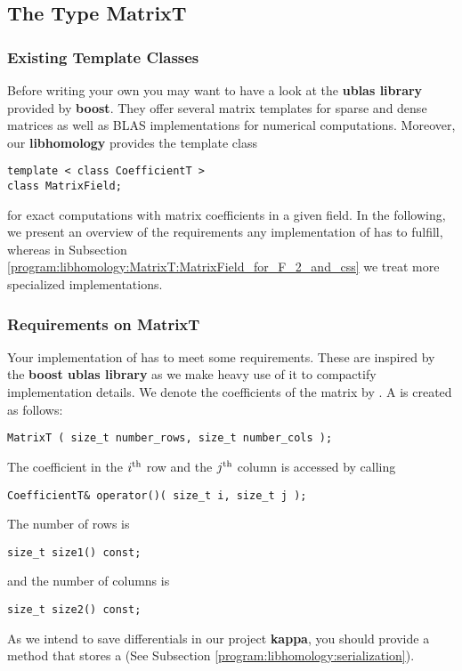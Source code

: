 \subsection{The Type MatrixT}
\label{program:libhomology:MatrixT}
\subsubsection{Existing Template Classes}
Before writing your own  you may want to have a look at the {\bfseries ublas library} provided by {\bfseries boost}.
They offer several matrix templates for sparse and dense matrices 
as well as BLAS implementations for numerical computations.
Moreover, our {\bfseries libhomology} provides the template class
\begin{lstlisting}
template < class CoefficientT >
class MatrixField;
\end{lstlisting}
for exact computations with matrix coefficients in a given field.
In the following, we present an overview of the requirements any implementation of  has to fulfill, whereas
in Subsection \ref{program:libhomology:MatrixT:MatrixField_for_F_2_and_css} we treat more specialized implementations.

\subsubsection{Requirements on MatrixT}
Your implementation of  has to meet some requirements.
These are inspired by the {\bfseries boost ublas library} as we make heavy use of it to compactify implementation details.
We denote the coefficients of the matrix by .
A  is created as follows:
\begin{lstlisting}
MatrixT ( size_t number_rows, size_t number_cols );
\end{lstlisting}
The coefficient in the $i^{\text{th}}$ row and the $j^{\text{th}}$ column is accessed by calling
\begin{lstlisting}
CoefficientT& operator()( size_t i, size_t j );
\end{lstlisting}
The number of rows is 
\begin{lstlisting}
size_t size1() const;
\end{lstlisting}
and the number of columns is
\begin{lstlisting}
size_t size2() const;
\end{lstlisting}

As we intend to save differentials in our project {\bfseries kappa}, you should provide a method that stores a  (See Subsection \ref{program:libhomology:serialization}).

